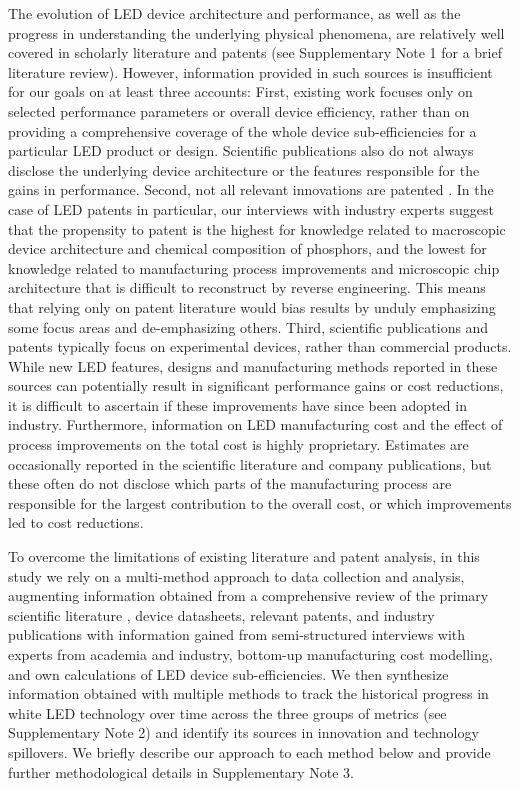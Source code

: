 \documentclass[parskip=full]{article}
\begin{document}
The evolution of LED device architecture and performance, as well as the progress in understanding the underlying physical phenomena, are relatively well covered in scholarly literature and patents (see Supplementary Note 1 for a brief literature review). However, information provided in such sources is insufficient for our goals on at least three accounts: First, existing work focuses only on selected performance parameters or overall device efficiency, rather than on providing a comprehensive coverage of the whole device sub-efficiencies for a particular LED product or design. Scientific publications also do not always disclose the underlying device architecture or the features responsible for the gains in performance. Second, not all relevant innovations are patented \cite{Pakes_1980,Fontana_2013}. In the case of LED patents in particular, our interviews with industry experts suggest that the propensity to patent is the highest for knowledge related to macroscopic device architecture and chemical composition of phosphors, and the lowest for knowledge related to manufacturing process improvements and microscopic chip architecture that is difficult to reconstruct by reverse engineering. This means that relying only on patent literature would bias results by unduly emphasizing some focus areas and de-emphasizing others. Third, scientific publications and patents typically focus on experimental devices, rather than commercial products. While new LED features, designs and manufacturing methods reported in these sources can potentially result in significant performance gains or cost reductions, it is difficult to ascertain if these improvements have since been adopted in industry. Furthermore, information on LED manufacturing cost and the effect of process improvements on the total cost is highly proprietary. Estimates are occasionally reported in the scientific literature and company publications, but these often do not disclose which parts of the manufacturing process are responsible for the largest contribution to the overall cost, or which improvements led to cost reductions.

To overcome the limitations of existing literature and patent analysis, in this study we rely on a multi-method approach to data collection and analysis, augmenting information obtained from a comprehensive review of the primary scientific literature \cite{Haddaway_2014}, device datasheets, relevant patents, and industry publications with information gained from semi-structured interviews with experts from academia and industry, bottom-up manufacturing cost modelling, and own calculations of LED device sub-efficiencies. We then synthesize information obtained with multiple methods to track the historical progress in white LED technology over time across the three groups of metrics (see Supplementary Note 2) and identify its sources in innovation and technology spillovers. We briefly describe our approach to each method below and provide further methodological details in Supplementary Note 3. 
\end{document}
